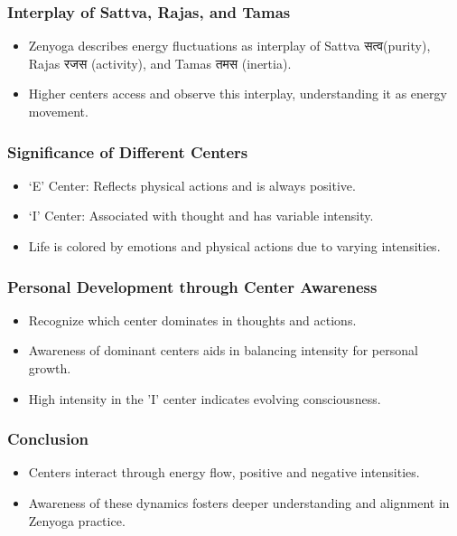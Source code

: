 \begin{frame}[fragile]\frametitle{Interplay of Sattva, Rajas, and Tamas}
    \begin{itemize}
        \item Zenyoga describes energy fluctuations as interplay of Sattva सत्व(purity), Rajas रजस (activity), and Tamas तमस (inertia).
        \item Higher centers access and observe this interplay, understanding it as energy movement.
    \end{itemize}
\end{frame}

\begin{frame}[fragile]\frametitle{Significance of Different Centers}
    \begin{itemize}
        \item ‘E’ Center: Reflects physical actions and is always positive.
        \item ‘I’ Center: Associated with thought and has variable intensity.
        \item Life is colored by emotions and physical actions due to varying intensities.
    \end{itemize}
\end{frame}

\begin{frame}[fragile]\frametitle{Personal Development through Center Awareness}
    \begin{itemize}
        \item Recognize which center dominates in thoughts and actions.
        \item Awareness of dominant centers aids in balancing intensity for personal growth.
        \item High intensity in the 'I' center indicates evolving consciousness.
    \end{itemize}
\end{frame}

\begin{frame}[fragile]\frametitle{Conclusion}
    \begin{itemize}
        \item Centers interact through energy flow, positive and negative intensities.
        \item Awareness of these dynamics fosters deeper understanding and alignment in Zenyoga practice.
    \end{itemize}
\end{frame}

